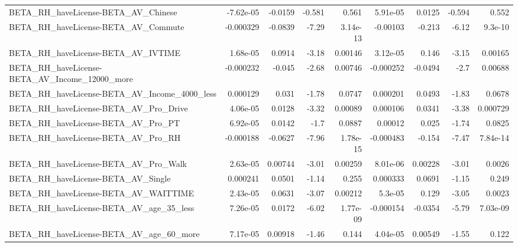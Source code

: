 \begin{tabular}{lrrrrrrrr}
BETA\_RH\_haveLicense-BETA\_AV\_Chinese                &   -7.62e-05 &      -0.0159 &    -0.581 &    0.561 &   5.91e-05 &      0.0125 &       -0.594 &         0.552 \\
BETA\_RH\_haveLicense-BETA\_AV\_Commute                &   -0.000329 &      -0.0839 &     -7.29 & 3.14e-13 &   -0.00103 &      -0.213 &        -6.12 &       9.3e-10 \\
BETA\_RH\_haveLicense-BETA\_AV\_IVTIME                 &    1.68e-05 &       0.0914 &     -3.18 &  0.00146 &   3.12e-05 &       0.146 &        -3.15 &       0.00165 \\
BETA\_RH\_haveLicense-BETA\_AV\_Income\_12000\_more      &   -0.000232 &       -0.045 &     -2.68 &  0.00746 &  -0.000252 &     -0.0494 &         -2.7 &       0.00688 \\
BETA\_RH\_haveLicense-BETA\_AV\_Income\_4000\_less       &    0.000129 &        0.031 &     -1.78 &   0.0747 &   0.000201 &      0.0493 &        -1.83 &        0.0678 \\
BETA\_RH\_haveLicense-BETA\_AV\_Pro\_Drive              &    4.06e-05 &       0.0128 &     -3.32 &  0.00089 &   0.000106 &      0.0341 &        -3.38 &      0.000729 \\
BETA\_RH\_haveLicense-BETA\_AV\_Pro\_PT                 &    6.92e-05 &       0.0142 &      -1.7 &   0.0887 &    0.00012 &       0.025 &        -1.74 &        0.0825 \\
BETA\_RH\_haveLicense-BETA\_AV\_Pro\_RH                 &   -0.000188 &      -0.0627 &     -7.96 & 1.78e-15 &  -0.000483 &      -0.154 &        -7.47 &      7.84e-14 \\
BETA\_RH\_haveLicense-BETA\_AV\_Pro\_Walk               &    2.63e-05 &      0.00744 &     -3.01 &  0.00259 &   8.01e-06 &     0.00228 &        -3.01 &        0.0026 \\
BETA\_RH\_haveLicense-BETA\_AV\_Single                 &    0.000241 &       0.0501 &     -1.14 &    0.255 &   0.000333 &      0.0691 &        -1.15 &         0.249 \\
BETA\_RH\_haveLicense-BETA\_AV\_WAITTIME               &    2.43e-05 &       0.0631 &     -3.07 &  0.00212 &    5.3e-05 &       0.129 &        -3.05 &        0.0023 \\
BETA\_RH\_haveLicense-BETA\_AV\_age\_35\_less            &    7.26e-05 &       0.0172 &     -6.02 & 1.77e-09 &  -0.000154 &     -0.0354 &        -5.79 &      7.03e-09 \\
BETA\_RH\_haveLicense-BETA\_AV\_age\_60\_more            &    7.17e-05 &      0.00918 &     -1.46 &    0.144 &   4.04e-05 &     0.00549 &        -1.55 &         0.122 \\

\end{tabular}
